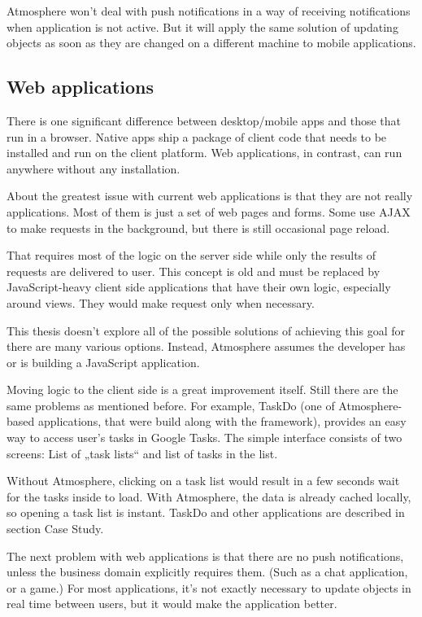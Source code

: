 Atmosphere won’t deal with push notifications in a way of receiving notifications when application is not active. But it will apply the same solution of updating objects as soon as they are changed on a different machine to mobile applications. 

\subsection{Web applications}

There is one significant difference between desktop/mobile apps and those that run in a browser. Native apps ship a package of client code that needs to be installed and run on the client platform. Web applications, in contrast, can run anywhere without any installation.

About the greatest issue with current web applications is that they are not really applications. Most of them is just a set of web pages and forms. Some use AJAX to make requests in the background, but there is still occasional page reload.

That requires most of the logic on the server side while only the results of requests are delivered to user. This concept is old and must be replaced by JavaScript-heavy client side applications that have their own logic, especially around views. They would make request only when necessary.

This thesis doesn’t explore all of the possible solutions of achieving this goal for there are many various options. Instead, Atmosphere assumes the developer has or is building a JavaScript application.

Moving logic to the client side is a great improvement itself. Still there are the same problems as mentioned before. For example, TaskDo (one of Atmosphere-based applications, that were build along with the framework), provides an easy way to access user’s tasks in Google Tasks. The simple interface consists of two screens: List of „task lists“ and list of tasks in the list.

Without Atmosphere, clicking on a task list would result in a few seconds wait for the tasks inside to load. With Atmosphere, the data is already cached locally, so opening a task list is instant. TaskDo and other applications are described in section Case Study.

The next problem with web applications is that there are no push notifications, unless the business domain explicitly requires them. (Such as a chat application, or a game.) For most applications, it’s not exactly necessary to update objects  in real time between users, but it would make the application better.
